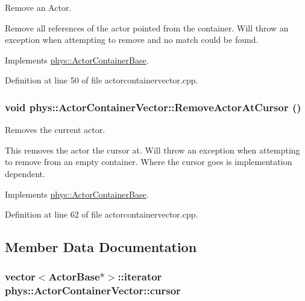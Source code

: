 Remove an Actor. 

Remove all references of the actor pointed from the container. Will throw an exception when attempting to remove and no match could be found. 

Implements \hyperlink{classphys_1_1ActorContainerBase_a523072e42f6b581d044432f84a84ede4}{phys::ActorContainerBase}.



Definition at line 50 of file actorcontainervector.cpp.

\hypertarget{classphys_1_1ActorContainerVector_a430977daf010a25f53df6cf37954f8ca}{
\subsubsection[{RemoveActorAtCursor}]{\setlength{\rightskip}{0pt plus 5cm}void phys::ActorContainerVector::RemoveActorAtCursor ()}}
\label{d3/d64/classphys_1_1ActorContainerVector_a430977daf010a25f53df6cf37954f8ca}


Removes the current actor. 

This removes the actor the cursor at. Will throw an exception when attempting to remove from an empty container. Where the cursor goes is implementation dependent. 

Implements \hyperlink{classphys_1_1ActorContainerBase_a60f37a056e8750f3b389c5ceed14520c}{phys::ActorContainerBase}.



Definition at line 62 of file actorcontainervector.cpp.



\subsection{Member Data Documentation}
\hypertarget{classphys_1_1ActorContainerVector_a08bdad9b15e265b5d44470f21766b6ed}{
\subsubsection[{cursor}]{\setlength{\rightskip}{0pt plus 5cm}vector$<${\bf ActorBase}$\ast$$>$::iterator {\bf phys::ActorContainerVector::cursor}}}
\label{d3/d64/classphys_1_1ActorContainerVector_a08bdad9b15e265b5d44470f21766b6ed}


